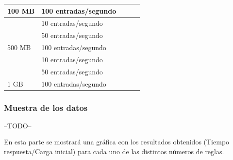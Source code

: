 \begin{table}[H]
\begin{tabular}{|l|l|l|l|l|}
\multirow{-3}{*}{100 MB}                                 & 100 entradas/segundo                              &                                        &                                        &                                                 \\ \hline
                                                         & 10 entradas/segundo                               &                                        &                                        &                                                 \\ \cline{2-5} 
                                                         & 50 entradas/segundo                               &                                        &                                        &                                                 \\ \cline{2-5} 
\multirow{-3}{*}{500 MB}                                 & 100 entradas/segundo                              &                                        &                                        &                                                 \\ \hline
                                                         & 10 entradas/segundo                               &                                        &                                        &                                                 \\ \cline{2-5} 
                                                         & 50 entradas/segundo                               &                                        &                                        &                                                 \\ \cline{2-5} 
\multirow{-3}{*}{1 GB}                                   & 100 entradas/segundo                              &                                        &                                        &                                                 \\ \hline
\end{tabular}
\end{table}

\subsubsection{Muestra de los datos}

--TODO--

En esta parte se mostrará una gráfica con los resultados obtenidos (Tiempo respuesta/Carga inicial) para cada uno de las distintos números de reglas.


